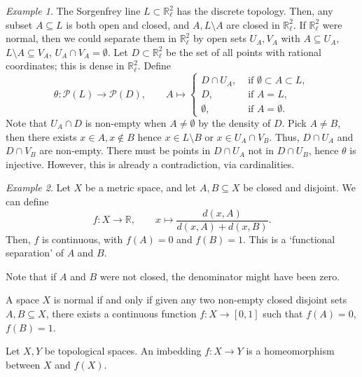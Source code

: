 \documentclass[11pt]{article}
\newcommand{\R}{\mathbb{R}}
\theoremstyle{definition}
\theoremstyle{remark}
\newtheorem*{example}{Example}
\numberwithin{equation}{section}
\begin{document}
    \begin{example}
        The Sorgenfrey line $L \subset \R_\ell^2$ has the discrete topology. Then,
        any subset $A \subseteq L$ is both open and closed, and $A, L\setminus A$ are
        closed in $\R_\ell^2$. If $\R_\ell^2$ were normal, then we could separate
        them in $\R_\ell^2$ by open sets $U_A, V_A$ with $A \subseteq U_A$,
        $L\setminus A \subseteq V_A$, $U_A \cap V_A = \emptyset$. Let $D \subset
        \R_\ell^2$ be the set of all points with rational coordinates; this is dense
        in $\R_\ell^2$. Define \[
            \theta\colon \mathcal{P}(L) \to \mathcal{P}(D), \qquad 
            A \mapsto \begin{cases}
                D \cap U_A, &\text{ if } \emptyset \subset A \subset L, \\
                D, &\text{ if } A = L, \\
                \emptyset, &\text{ if } A = \emptyset.
            \end{cases}
        \] Note that $U_A \cap D$ is non-empty when $A \neq \emptyset$ by the density
        of $D$. Pick $A \neq B$, then there exists $x \in A, x \notin B$ hence $x \in
        L \setminus B$ or $x \in U_A \cap V_B$. Thus, $D \cap U_A$ and $D \cap V_B$
        are non-empty. There must be points in $D \cap U_A$ not in $D \cap U_B$,
        hence $\theta$ is injective. However, this is already a contradiction, via
        cardinalities.
    \end{example}

    \begin{example}
        Let $X$ be a metric space, and let $A, B \subseteq X$ be closed and disjoint.
        We can define \[
            f\colon X \to \R, \qquad x \mapsto \frac{d(x, A)}{d(x, A) + d(x, B)}.
        \] Then, $f$ is continuous, with $f(A) = 0$ and $f(B) = 1$. This is a
        `functional separation' of $A$ and $B$.

        Note that if $A$ and $B$ were not closed, the denominator might have been
        zero.
    \end{example}


    \begin{lemma}[Urysohn]
        A space $X$ is normal if and only if given any two non-empty closed disjoint
        sets $A, B \subseteq X$, there exists a continuous function $f\colon X \to
        [0, 1]$ such that $f(A) = 0$, $f(B) = 1$.
    \end{lemma}

    \begin{definition}
        Let $X, Y$ be topological spaces. An imbedding $f\colon X \to Y$ is a
        homeomorphism between $X$ and $f(X)$.
    \end{definition}
\end{document}
